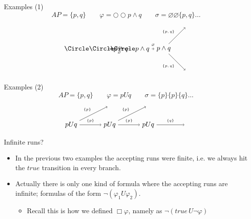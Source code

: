 \documentclass{beamer}
\begin{document}
\begin{frame}{Examples (1)}
$$AP = \{p, q\} \qquad \varphi = \Circle \Circle p \wedge q \qquad \sigma = \varnothing \varnothing \{p, q\} \dots$$
$$
\begin{tikzpicture}[node distance=5em, auto]
\node (1) {$\Circle \Circle p \wedge q$};
\node [right of=1] (2) {$\Circle p \wedge q$};
\node [right of=2] (3) {$p \wedge q$};
\node [above right of=3] (4a) {};
\node [below right of=3] (4b) {};
\path[->] (1) edge node {{\tiny $\varnothing$}} (2)
          (2) edge node {{\tiny $\varnothing$}} (3)
          (3) edge node {{\tiny $\{p, q\}$}} (4a)
          (3) edge node [below left] {{\tiny $\{p, q\}$}} (4b);
\end{tikzpicture}
$$
\end{frame}

\begin{frame}{Examples (2)}
$$AP = \{p, q\} \qquad \varphi = p U q \qquad \sigma = \{p\} \{p\} \{q\} \dots$$
$$
\begin{tikzpicture}[node distance=5em, auto]
\node (1) at (0, 0) {$p U q$};
\node (2a) at (2, 1) {};
\node (2) at (2, 0) {$p U q$};
\node (3a) at (4, 1) {};
\node (3) at (4, 0) {$p U q$};
\node (4) at (6, 0) {};
\path[->] (1) edge node {{\tiny $\{p\}$}} (2a)
          (1) edge node {{\tiny $\{p\}$}} (2)
          (2) edge node {{\tiny $\{p\}$}} (3a)
          (2) edge node {{\tiny $\{p\}$}} (3)
          (3) edge node {{\tiny $\{q\}$}} (4);
\end{tikzpicture}
$$
\end{frame}

\begin{frame}{Infinite runs?}
\begin{itemize}
\item In the previous two examples the accepting runs were finite, i.e. we
always hit the $true$ transition in every branch.
\item Actually there is only one kind of formula where the accepting runs
are infinite; formulas of the form $\neg (\varphi_1 U \varphi_2)$.
    \begin{itemize}
    \item Recall this is how we defined $\Box \varphi$, namely as $\neg (true \, U \neg \varphi)$
    \end{itemize}
\end{itemize}
\end{frame}
\end{document}
